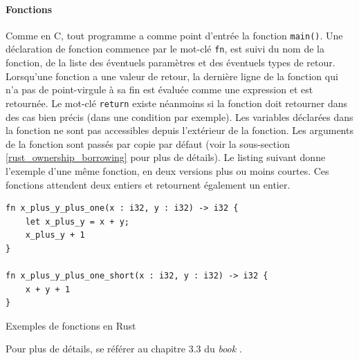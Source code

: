 \paragraph{Fonctions}
Comme en C, tout programme a comme point d'entrée la fonction \texttt{main()}. Une 
déclaration de fonction commence par le mot-clé \texttt{fn}, est suivi du nom de la 
fonction, de la liste des éventuels paramètres et des éventuels types de retour. Lorsqu'une 
fonction a une valeur de retour, la dernière ligne de la fonction qui n'a pas de point-virgule 
à sa fin est évaluée comme une expression et est retournée. Le mot-clé \texttt{return} 
existe néanmoins si la fonction doit retourner dans des cas bien précis (dans une condition par 
exemple). Les variables déclarées dans la fonction ne sont pas accessibles depuis l'extérieur de la 
fonction. Les arguments de la fonction sont passés par copie par défaut (voir la sous-section 
\ref{rust_ownership_borrowing} pour plus de détails). Le listing suivant donne l'exemple d'une même 
fonction, en deux versions plus ou moins courtes. Ces fonctions attendent deux entiers et retournent 
également un entier.
\bigbreak
\begin{code}
    \begin{verbatim}
fn x_plus_y_plus_one(x : i32, y : i32) -> i32 {
    let x_plus_y = x + y;
    x_plus_y + 1
}

fn x_plus_y_plus_one_short(x : i32, y : i32) -> i32 {
    x + y + 1
}
    \end{verbatim}
    \caption{Exemples de fonctions en Rust}
    \label{rust_functions}
\end{code}
\bigbreak
Pour plus de détails, se référer au chapitre 3.3 du \textit{book} \cite{ref0}.

